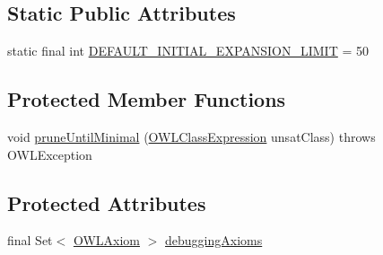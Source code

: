 \subsection*{Static Public Attributes}
\begin{DoxyCompactItemize}
\item 
static final int \hyperlink{classcom_1_1clarkparsia_1_1owlapi_1_1explanation_1_1_black_box_explanation_a31eb8b8374e51d80e34ec4231ef531be}{D\-E\-F\-A\-U\-L\-T\-\_\-\-I\-N\-I\-T\-I\-A\-L\-\_\-\-E\-X\-P\-A\-N\-S\-I\-O\-N\-\_\-\-L\-I\-M\-I\-T} = 50
\end{DoxyCompactItemize}
\subsection*{Protected Member Functions}
\begin{DoxyCompactItemize}
\item 
void \hyperlink{classcom_1_1clarkparsia_1_1owlapi_1_1explanation_1_1_black_box_explanation_a589a2af4f2293d56fe53bd633c05ef54}{prune\-Until\-Minimal} (\hyperlink{interfaceorg_1_1semanticweb_1_1owlapi_1_1model_1_1_o_w_l_class_expression}{O\-W\-L\-Class\-Expression} unsat\-Class)  throws O\-W\-L\-Exception 
\end{DoxyCompactItemize}
\subsection*{Protected Attributes}
\begin{DoxyCompactItemize}
\item 
final Set$<$ \hyperlink{interfaceorg_1_1semanticweb_1_1owlapi_1_1model_1_1_o_w_l_axiom}{O\-W\-L\-Axiom} $>$ \hyperlink{classcom_1_1clarkparsia_1_1owlapi_1_1explanation_1_1_black_box_explanation_a355655cb45079f7a1a3c8510782ab077}{debugging\-Axioms}
\end{DoxyCompactItemize}
